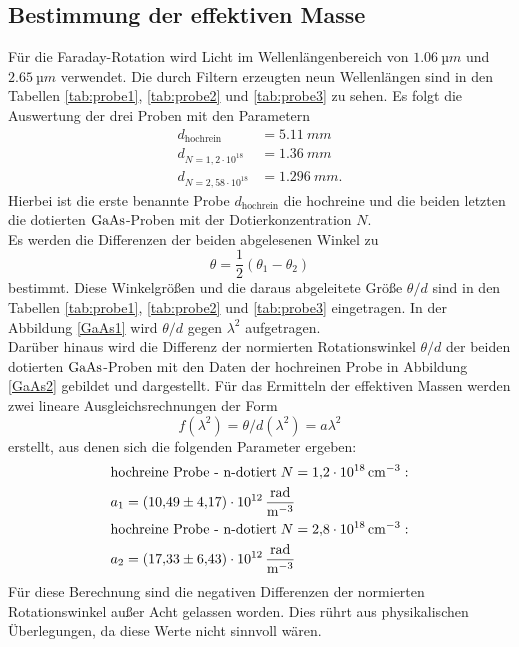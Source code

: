 \subsection{Bestimmung der effektiven Masse}
Für die Faraday-Rotation wird Licht im Wellenlängenbereich von $\SI{1,06}{µm}$ und $\SI{2,65}{µm}$ verwendet.
Die durch Filtern erzeugten neun Wellenlängen sind in den Tabellen \ref{tab:probe1}, \ref{tab:probe2} und \ref{tab:probe3} zu sehen.
Es folgt die Auswertung der drei Proben mit den Parametern
\begin{align*}
d_\text{hochrein}&=\SI{5,11}{mm}\\
d_{N=1,2\cdot10^{18}}&=\SI{1,36}{mm}\\
d_{N=2,58\cdot10^{18}}&=\SI{1,296}{mm}.
\end{align*}
Hierbei ist die erste benannte Probe $d_\text{hochrein}$ die hochreine und die beiden letzten die dotierten $\ce{GaAs}$-Proben mit der Dotierkonzentration $N$.\\
Es werden die Differenzen der beiden abgelesenen Winkel zu
\begin{equation}
  \theta=\frac{1}{2}(\theta_1-\theta_2)
\end{equation}
bestimmt. Diese Winkelgrößen und die daraus abgeleitete Größe $\theta/d$ sind in den Tabellen \ref{tab:probe1}, \ref{tab:probe2} und \ref{tab:probe3} eingetragen.
In der Abbildung \ref{GaAs1} wird $\theta/d$ gegen $\lambda^2$ aufgetragen.\\
Darüber hinaus wird die Differenz der normierten Rotationswinkel $\theta/d$ der beiden dotierten $\ce{GaAs}$-Proben mit den Daten der hochreinen Probe in Abbildung \ref{GaAs2} gebildet und dargestellt.
Für das Ermitteln der effektiven Massen werden zwei lineare Ausgleichsrechnungen der Form
\begin{equation}
  f(\lambda^2)=\theta/d(\lambda^2)=a\lambda^2
\end{equation}
erstellt, aus denen sich die folgenden Parameter ergeben:
\begin{align*}
&\text{hochreine Probe - n-dotiert}\; N=\SI{1.2e18}{\centi\meter^{-3}}:\\
&a_1=\SI{10,49 \pm 4,17e12}{\frac{\mathrm{rad}}{\meter^{-3}}}\\
&\text{hochreine Probe - n-dotiert}\; N=\SI{2.8e18}{\centi\meter^{-3}}:\\
&a_2=\SI{17,33\pm6,43e12}{\frac{\mathrm{rad}}{\meter^{-3}}}\\
\end{align*}
Für diese Berechnung sind die negativen Differenzen der normierten Rotationswinkel außer Acht gelassen worden. Dies rührt aus physikalischen Überlegungen, da diese Werte nicht sinnvoll wären.

